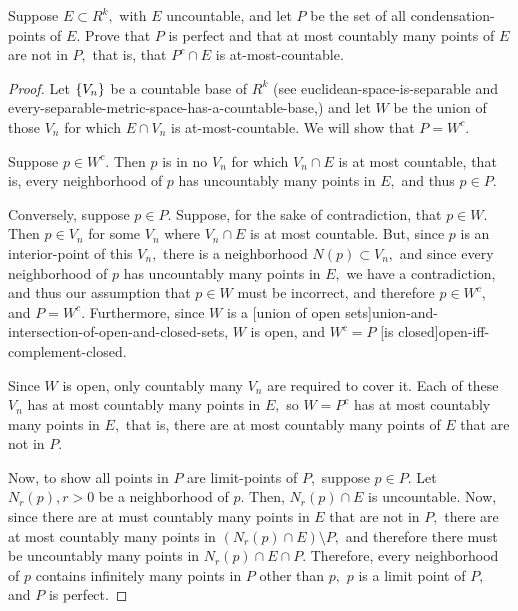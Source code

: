 \documentclass{article}
\begin{document}
\begin{theorem}\label{condensation-points-of-an-uncountable-subset-of-rk-are-perfect}
Suppose $E \subset R^k,$ with $E$ \@{uncountable}, and let $P$ be the set of all \@{condensation-points} of $E.$ Prove that $P$ is \@{perfect} and that at most countably many points of $E$ are not in $P,$ that is, that $P^c \cap E$ is \@{at-most-countable}.
\end{theorem}

\begin{proof}
Let $\left\{ V_n \right\}$ be a \@{countable} \@{base} of $R^k$ (see \@{euclidean-space-is-separable} and \@{every-separable-metric-space-has-a-countable-base},) and let $W$ be the union of those $V_n$ for which $E \cap V_n$ is \@{at-most-countable}. We will show that $P = W^c.$

Suppose $p \in W^c.$ Then $p$ is in no $V_n$ for which $V_n \cap E$ is at most countable, that is, every \@{neighborhood} of $p$ has uncountably many points in $E,$ and thus $p \in P.$

Conversely, suppose $p \in P.$ Suppose, for the sake of contradiction, that $p \in W.$ Then $p \in V_n$ for some $V_n$ where $V_n \cap E$ is at most countable. But, since $p$ is an \@{interior-point} of this $V_n,$ there is a neighborhood $N(p) \subset V_n,$ and since every neighborhood of $p$ has uncountably many points in $E,$ we have a contradiction, and thus our assumption that $p \in W$ must be incorrect, and therefore $p \in W^c,$ and $P = W^c.$ Furthermore, since $W$ is a \@[union of open sets]{union-and-intersection-of-open-and-closed-sets}, $W$ is open, and $W^c = P$ \@[is closed]{open-iff-complement-closed}.

Since $W$ is open, only countably many $V_n$ are required to cover it. Each of these $V_n$ has at most countably many points in $E,$ so $W = P^c$ has at most countably many points in $E,$ that is, there are at most countably many points of $E$ that are not in $P.$

Now, to show all points in $P$ are \@{limit-points} of $P,$ suppose $p \in P.$ Let $N_{r}(p), r > 0$ be a neighborhood of $p.$ Then, $N_{r}(p) \cap E$ is \@{uncountable}. Now, since there are at must countably many points in $E$ that are not in $P,$ there are at most countably many points in $(N_{r}(p) \cap E) \setminus P,$ and therefore there must be uncountably many points in $N_{r}(p) \cap E \cap P.$ Therefore, every neighborhood of $p$ contains infinitely many points in $P$ other than $p,$ $p$ is a limit point of $P,$ and $P$ is \@{perfect}.
\end{proof}
\end{document}

